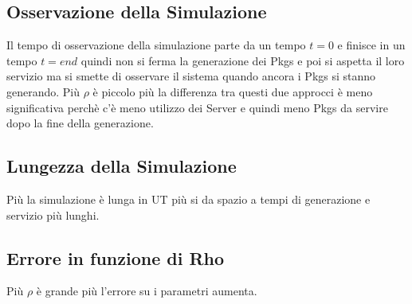 \documentclass[12pt,a4paper]{article}
\begin{document}
\subsection{Osservazione della Simulazione}
Il tempo di osservazione della simulazione parte da un tempo $t=0$ e finisce in un tempo $t=end$ quindi non si ferma la generazione dei Pkgs e poi si aspetta il loro servizio ma si smette di osservare il sistema quando ancora i Pkgs si stanno generando.
Più $\rho$ è piccolo più la differenza tra questi due approcci è meno significativa perchè c'è meno utilizzo dei Server e quindi meno Pkgs da servire dopo la fine della generazione.
\subsection{Lungezza della Simulazione}
Più la simulazione è lunga in UT più si da spazio a tempi di generazione e servizio più lunghi.
\subsection{Errore in funzione di Rho}
Più $\rho$ è grande più l'errore su i parametri aumenta.


\newpage
\lstlistoflistings
\end{document}
